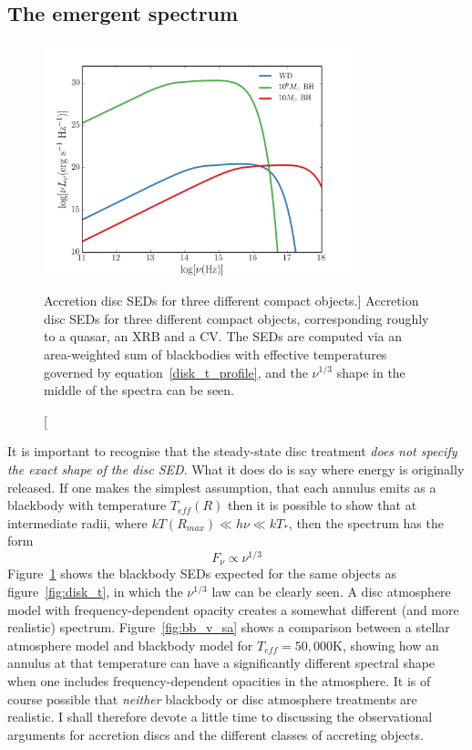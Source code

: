 \subsection{The emergent spectrum}


\begin{figure}
\centering
\includegraphics[width=0.8\textwidth]{figures/01-intro/disc_seds.png}
\caption
[Accretion disc SEDs for three different compact objects.]
{
Accretion disc SEDs for three different compact objects, corresponding roughly
to a quasar, an XRB and a CV. The SEDs are computed via an area-weighted sum
of blackbodies with effective temperatures governed by equation~\ref{disk_t_profile},
and the $\nu^{1/3}$ shape in the middle of the spectra can be seen.
} 
\label{fig:disc_seds}
\end{figure}

It is important to recognise that the steady-state disc treatment
{\sl does not specify the exact shape of the disc SED}. What it does do is 
say where energy is originally released. If one makes the simplest assumption,
that each annulus emits as a blackbody with temperature $T_{eff} (R)$ then it is 
possible to show that at intermediate radii, where $kT(R_{max}) \ll h \nu \ll kT_*$,
then the spectrum has the form 
\begin{equation}
F_{\nu} \propto \nu^{1/3}
\end{equation}
Figure~\ref{fig:disc_seds} shows the blackbody SEDs expected for the same 
objects as figure~\ref{fig:disk_t}, in
which the $\nu^{1/3}$ law can be clearly seen.
A disc atmosphere model with frequency-dependent opacity creates a somewhat 
different (and more realistic) spectrum. 
Figure~\ref{fig:bb_v_sa} shows a comparison between a stellar atmosphere model and
blackbody model for $T_{eff}=50,000$K, showing how an annulus at that temperature
can have a significantly different spectral shape when one includes frequency-dependent opacities
in the atmosphere. It is of course possible that {\em neither} blackbody or disc atmosphere
treatments are realistic. I shall therefore devote a little time to discussing
the observational arguments for accretion discs and the different classes of accreting 
objects.


